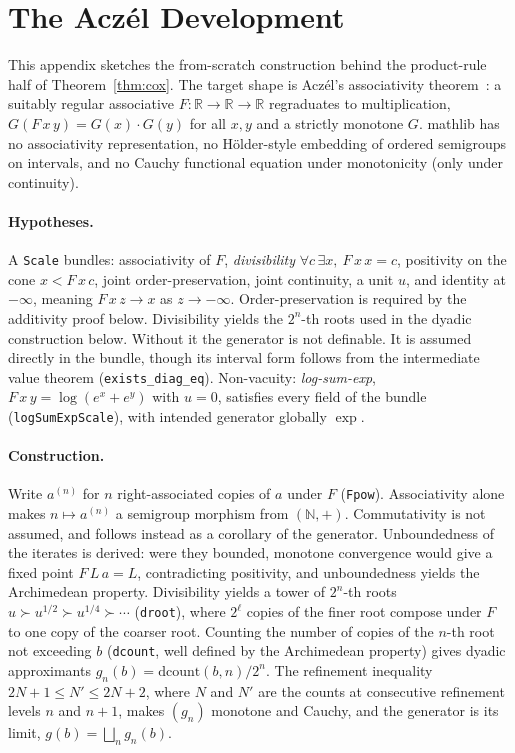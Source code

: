 \section{The Acz\'el Development}
\label{app:aczel}

This appendix sketches the from-scratch construction behind the
product-rule half of Theorem~\ref{thm:cox}.
The target shape is Acz\'el's associativity
theorem~\cite{aczel1966}: a suitably regular associative
$F : \mathbb{R} \to \mathbb{R} \to \mathbb{R}$ regraduates to
multiplication, $G(F\,x\,y) = G(x) \cdot G(y)$ for all $x, y$ and a
strictly monotone $G$.  \textsf{mathlib} has no
associativity representation, no H\"older-style embedding of ordered
semigroups on intervals, and no Cauchy functional equation under
monotonicity (only under continuity).

\paragraph{Hypotheses.}
A \texttt{Scale} bundles: associativity of $F$, \emph{divisibility}
$\forall c\, \exists x,\ F\,x\,x = c$, positivity on the cone
$x < F\,x\,c$, joint order-preservation, joint continuity, a unit
$u$, and identity at $-\infty$, meaning
$F\,x\,z \to x$ as $z \to -\infty$.  Order-preservation is required
by the additivity proof below.  Divisibility yields the
$2^{n}$-th roots used in the dyadic construction below.  Without it
the generator is not definable.  It is assumed directly in the
bundle, though its interval form follows from the intermediate value
theorem (\texttt{exists\_diag\_eq}).  Non-vacuity: \emph{log-sum-exp},
$F\,x\,y = \log(e^x + e^y)$ with $u = 0$, satisfies every field of
the bundle (\texttt{logSumExpScale}), with intended generator
globally $\exp$.

\paragraph{Construction.}
Write $a^{(n)}$ for $n$ right-associated copies of $a$ under $F$
(\texttt{Fpow}).  Associativity alone makes
$n \mapsto a^{(n)}$ a semigroup morphism from $(\mathbb{N}, +)$.
Commutativity is not assumed, and follows instead as a corollary of
the generator.  Unboundedness of the iterates is derived: 
were they bounded, monotone convergence would give a fixed
point $F\,L\,a = L$, contradicting positivity, and unboundedness
yields the Archimedean property.  Divisibility yields a tower of
$2^n$-th roots $u \succ u^{1/2} \succ u^{1/4} \succ \cdots$
(\texttt{droot}), where $2^\ell$ copies of the finer root compose
under $F$ to one copy of the coarser root.  Counting the number of
copies of the $n$-th root not exceeding $b$
(\texttt{dcount}, well defined by the Archimedean property) gives
dyadic approximants $g_n(b) = \mathrm{dcount}(b,n)/2^n$.  The
refinement inequality $2N + 1 \le N' \le 2N + 2$, where $N$ and $N'$
are the counts at consecutive refinement levels $n$ and $n+1$, makes
$(g_n)$ monotone and Cauchy, and the generator is its limit,
$g(b) = \bigsqcup_n g_n(b)$.

